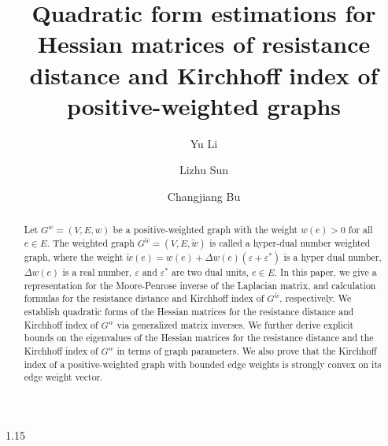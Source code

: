 \documentclass[preprint,12pt]{elsarticle1}
\numberwithin{equation}{section}
\begin{document}
\begin{spacing}{1.15}
\begin{frontmatter}
\title{\textbf{ Quadratic form estimations for Hessian matrices of resistance distance and Kirchhoff index of positive-weighted graphs }}

\author[label1]{Yu Li} 
\author[label1]{Lizhu Sun}
\author[label1]{Changjiang Bu} 


\address[label1]{College of Mathematical Sciences, Harbin Engineering University, Harbin, PR China}


\begin{abstract}

Let $G^{w}=(V,E,w)$ be a positive-weighted graph with the weight $w(e)>0$ for all $e\in E.$
 The weighted graph $G^{\widetilde{w}}=(V,E,\widetilde{w})$  is called a hyper-dual number weighted graph, where the  weight  $\widetilde{w}(e)=w(e)+\Delta w(e)(\varepsilon+\varepsilon^{*})$ is a hyper dual number, $\Delta w(e)$ is a real number,  $\varepsilon$ and $\varepsilon^{*}$ are two dual units, $e\in E$. In this paper, we  give a representation for the Moore-Penrose inverse of the Laplacian matrix, and calculation formulas for the resistance distance and Kirchhoff index of  $G^{\widetilde{w}}$, respectively.   We establish  quadratic forms of the Hessian matrices for the resistance distance and Kirchhoff index of
$G^{w}$ via generalized matrix  inverses. We further derive explicit bounds on the eigenvalues of the Hessian matrices for the resistance distance and the Kirchhoff index of
$G^{w}$  in terms of  graph parameters. We  also prove that the Kirchhoff index of a positive-weighted graph with bounded edge weights is strongly convex on its edge weight vector.

\end{abstract}



\end{frontmatter}
\end{spacing}
\end{document}
